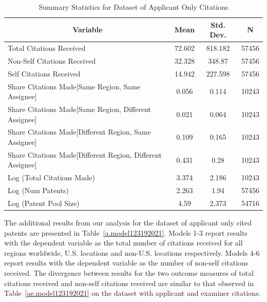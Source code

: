 \documentclass[12pt,letterpaper]{article}
\begin{document}
\begin{table}[htbp]\centering \caption{Summary Statistics for Dataset of Applicant Only Citations  \label{a.sumstat}}
\scriptsize
\singlespacing
\begin{tabular}{l c c  c}\hline\hline
\multicolumn{1}{c}{\textbf{Variable}} & \textbf{Mean}
 & \textbf{Std. Dev.} & \textbf{N}\\ \hline
Total Citations Received & 72.602 & 818.182  & 57456\\
Non-Self Citations Received& 32.328 & 348.87  & 57456\\
Self Citations Received& 14.942 & 227.598  & 57456\\
Share Citations Made[Same Region, Same Assignee] & 0.056 & 0.114  & 10243\\
Share Citations Made[Same Region, Different Assignee] & 0.021 & 0.064  & 10243\\
Share Citations Made[Different Region, Same Assignee] & 0.109 & 0.165  & 10243\\
Share Citations Made[Different Region, Different Assignee] & 0.431 & 0.28  & 10243\\
Log (Total Citations Made) & 3.374 & 2.186  & 10243\\
Log (Num Patents) & 2.263 & 1.94  & 57456\\
Log (Patent Pool Size) & 4.59 & 2.373  & 54716\\\hline
\end{tabular}
\end{table}

The additional results from our analysis for the dataset of applicant only cited patents are presented in Table~\ref{a.model123192021}. Models 1-3 report results with the dependent variable as the total number of citations received for all regions worldwide, U.S. locations and non-U.S. locations respectively. Models 4-6 report results with the dependent variable as the number of non-self citations received. The divergence between results for the two outcome measures of total citations received and non-self citations received are similar to that observed in Table~\ref{ae.model123192021} on the dataset with applicant and examiner citations. \par
\end{document}
